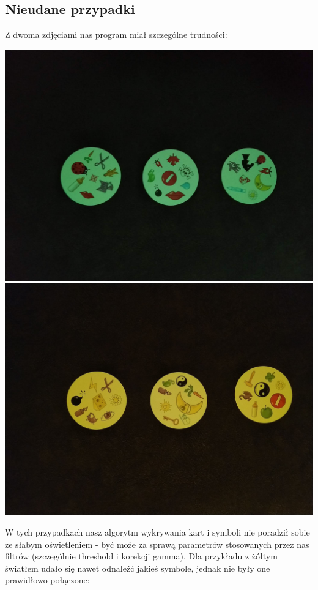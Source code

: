 \documentclass[10pt,a4paper]{article}
\begin{document}
\subsection{Nieudane przypadki}
Z dwoma zdjęciami nas program miał szczególne trudności:
\begin{center}
\includegraphics[scale=0.14]{hard/dobble15.jpg}
\includegraphics[scale=0.14]{hard/dobble17.jpg}
\end{center}
W tych przypadkach nasz algorytm wykrywania kart i symboli nie poradził sobie ze słabym oświetleniem - być może za sprawą parametrów stosowanych przez nas filtrów (szczególnie threshold i korekcji gamma). Dla przykładu z żółtym światłem udało się nawet odnaleźć jakieś symbole, jednak nie były one prawidłowo połączone:
\end{document}
